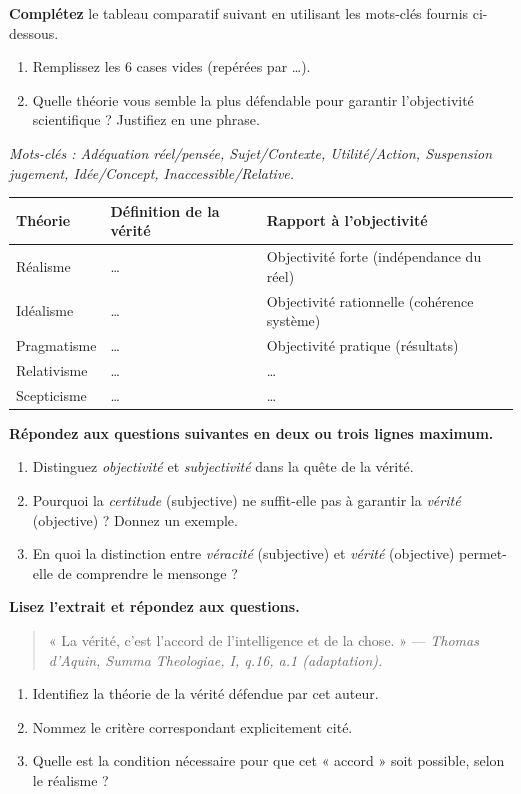 \documentclass[11pt]{article}
\begin{document}
\begin{exercice}
\textbf{Complétez} le tableau comparatif suivant en utilisant les mots-clés fournis ci-dessous.
\begin{enumerate}
    \item Remplissez les 6 cases vides (repérées par \ldots).
    \item Quelle théorie vous semble la plus défendable pour garantir l'objectivité scientifique ? Justifiez en une phrase.
\end{enumerate}
\textit{Mots-clés : Adéquation réel/pensée, Sujet/Contexte, Utilité/Action, Suspension jugement, Idée/Concept, Inaccessible/Relative.}

\begin{tabularx}{\linewidth}{|l|X|X|}
\hline
\textbf{Théorie} & \textbf{Définition de la vérité} & \textbf{Rapport à l'objectivité} \\
\hline
Réalisme & \ldots & Objectivité forte (indépendance du réel) \\
\hline
Idéalisme & \ldots & Objectivité rationnelle (cohérence système) \\
\hline
Pragmatisme & \ldots & Objectivité pratique (résultats) \\
\hline
Relativisme & \ldots & \ldots \\
\hline
Scepticisme & \ldots & \ldots \\
\hline
\end{tabularx}
\end{exercice}

\begin{exercice}
\textbf{Répondez aux questions suivantes en deux ou trois lignes maximum.}
\begin{enumerate}
    \item Distinguez \textit{objectivité} et \textit{subjectivité} dans la quête de la vérité.
    \item Pourquoi la \textit{certitude} (subjective) ne suffit-elle pas à garantir la \textit{vérité} (objective) ? Donnez un exemple.
    \item En quoi la distinction entre \textit{véracité} (subjective) et \textit{vérité} (objective) permet-elle de comprendre le mensonge ?
\end{enumerate}
\end{exercice}

\begin{exercice}
\textbf{Lisez l'extrait et répondez aux questions.}
\begin{quote}
« La vérité, c'est l'accord de l'intelligence et de la chose. » — \textit{Thomas d'Aquin, Summa Theologiae, I, q.16, a.1 (adaptation).}
\end{quote}
\begin{enumerate}
    \item Identifiez la théorie de la vérité défendue par cet auteur.
    \item Nommez le critère correspondant explicitement cité.
    \item Quelle est la condition nécessaire pour que cet « accord » soit possible, selon le réalisme ?
\end{enumerate}
\end{exercice}
\end{document}
